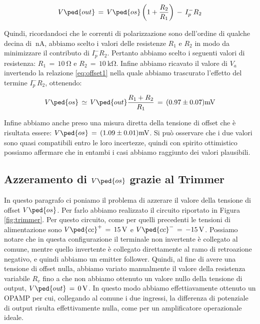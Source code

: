 \begin{equation}
	V\ped{out}\,=\,V\ped{os}\left(1+\frac{R_2}{R_1}\right)\,-\,I_{p}^-R_2
	\label{eq:offset1}
\end{equation}

Quindi, ricordandoci che le correnti di polarizzazione sono dell'ordine di qualche decina di $\SI{}{\nano\ampere}$, abbiamo scelto i valori delle resistenze $R_1$ e $R_2$ in modo da minimizzare il contributo di $I_{p}^-R_2$. Pertanto abbiamo scelto i seguenti valori di resistenza: $R_1\,=\,\SI{10}{\ohm}$ e $R_2\,=\,\SI{10}{\kilo\ohm}$.
Infine abbiamo ricavato il valore di $V_a$ invertendo la relazione \ref{eq:offset1} nella quale abbiamo trascurato l'effetto del termine $I_{p}^-R_2$, ottenendo:

\begin{equation}
	V\ped{os}\,\simeq\,V\ped{out}\frac{R_1+R_2}{R_1}\,=\, (0.97 \pm 0.07)\SI{}{\milli\volt}
\end{equation}

Infine abbiamo anche preso una misura diretta della tensione di offset che è risultata essere: $V\ped{os}\,=\,(1.09\pm0.01)\SI{}{\milli\volt}$. Si può osservare che i due valori sono quasi compatibili entro le loro incertezze, quindi con spirito ottimistico possiamo affermare che in entambi i casi abbiamo raggiunto dei valori plausibili.

\subsection*{Azzeramento di $V\ped{os}$ grazie al Trimmer}

In questo paragrafo ci poniamo il problema di azzerare il valore della tensione di offset $V\ped{os}$. Per farlo abbiamo realizzato il circuito riportato in Figura \ref{fig:trimmer}.
Per questo circuito, come per quelli precedenti le tensioni di alimentazione sono $V\ped{cc}^+\,=\,\SI{+15}{\volt}$ e $V\ped{cc}^-\,=\,\SI{-15}{\volt}$.
Possiamo notare che in questa configurazione il terminale non invertente è collegato al comune, mentre quello invertente è collegato direttamente al ramo di retroazione negativo, e quindi abbiamo un emitter follower.
Quindi, al fine di avere una tensione di offset nulla, abbiamo variato manualmente il valore della resistenza variabile $R_v$ fino a che non abbiamo ottenuto un valore nullo della tensione di output, $V\ped{out}\,=\,\SI{0}{\volt}$.
In questo modo abbiamo effettiavamente ottenuto un OPAMP per cui, collegando al comune i due ingressi, la differenza di potenziale di output risulta effettivamente nulla, come per un amplificatore operazionale ideale.

